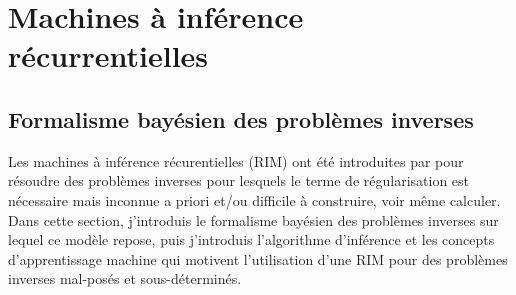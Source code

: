 \section{Machines à inférence récurrentielles}
\subsection{Formalisme bayésien des problèmes inverses}

Les machines à inférence récurentielles (RIM) ont été introduites par \citet{Putzky2017} pour résoudre des problèmes 
inverses pour lesquels le terme de régularisation est nécessaire mais inconnue a priori et/ou difficile à 
construire, voir même calculer. Dans cette section, j'introduis le formalisme bayésien des problèmes inverses sur lequel 
ce modèle repose, puis j'introduis l'algorithme d'inférence et les concepts d'apprentissage machine qui motivent 
l'utilisation d'une RIM pour des problèmes inverses mal-posés et sous-déterminés.

